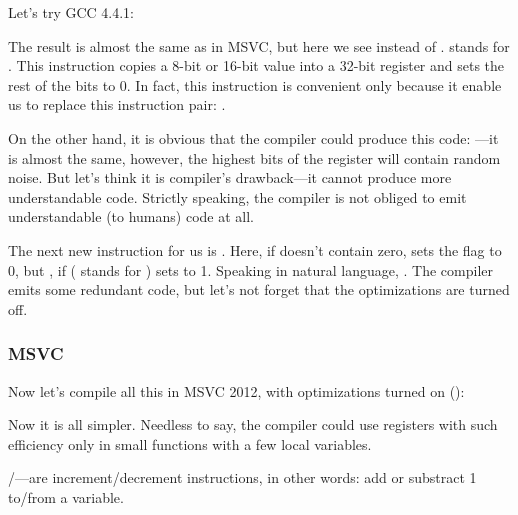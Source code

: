 Let's try GCC 4.4.1:



\label{movzx}

The result is almost the same as in MSVC, but here we see \MOVZX instead of \MOVSX. 
\MOVZX stands for . 
This instruction copies a 8-bit or 16-bit value into a 32-bit register and sets the rest of the bits to 0. 
In fact, this instruction is convenient only because it enable us to replace this instruction pair: 
.

On the other hand, it is obvious that the compiler could produce this code: 
---it is almost the same, however, 
the highest bits of the \EAX register will contain random noise. 
But let's think it is compiler's drawback---it cannot produce more understandable code. 
Strictly speaking, the compiler is not obliged to emit understandable (to humans) code at all.


The next new instruction for us is \SETNZ. 
Here, if \AL doesn't contain zero,  
sets the \ZF flag to 0, but \SETNZ, if  ( stands for ) sets \AL to 1.
Speaking in natural language, . 
The compiler emits some redundant code, but let's not forget that the optimizations are turned off.
\fi

\subsubsection{\Optimizing MSVC}
\label{strlen_MSVC_Ox}

Now let's compile all this in MSVC 2012, with optimizations turned on (\Ox):



Now it is all simpler.
Needless to say, the compiler could use registers with such efficiency
only in small functions with a few local variables.

\INC/\DEC---are \gls{increment}/\gls{decrement} instructions, in other words: add or substract 1 to/from a variable.

\ifdefined\IncludeOlly

\fi


